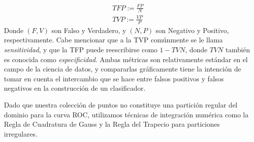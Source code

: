 \begin{align*}
    TFP := \frac{FP}{N} \\
    TVP := \frac{VP}{P}
\end{align*}
Donde $(F,V)$ son Falso y Verdadero, y $(N,P)$ son Negativo y Positivo, respectivamente. Cabe mencionar que a la TVP comúnmente se le llama \textit{sensitividad}, y que la TFP puede reescribirse como $1-TVN$, donde $TVN$ también es conocida como \textit{especificidad}. Ambas métricas son relativamente estándar en el campo de la ciencia de datos, y compararlas gráficamente tiene la intención de tomar en cuenta el intercambio que se hace entre falsos positivos y falsos negativos en la construcción de un clasificador.
\par
\noindent
Dado que nuestra colección de puntos no constituye una partición regular del dominio para la curva ROC, utilizamos técnicas de integración numérica como la Regla de Cuadratura de Gauss y la Regla del Trapecio para particiones irregulares.
